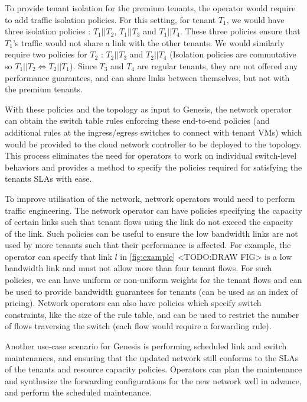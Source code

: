 \documentclass[]{sig}
\begin{document}
To provide tenant isolation for the premium tenants, the operator would require to add traffic isolation policies. For this setting, for tenant $T_1$, we would have three isolation policies : $T_1 || T_2$, $T_1 || T_3$ and $T_1 || T_4$. These three policies ensure that $T_1$'s traffic would not share a link with the other tenants. We would similarly require two policies for $T_2$ : $T_2 || T_3$ and $T_2 || T_4$ (Isolation policies are commutative so $T_1 || T_2 \iff T_2 || T_1$). Since $T_3$ and $T_4$ are regular tenants, they are not offered any performance guarantees, and can share links between themselves, but not with the premium tenants.  

With these policies and the topology as input to Genesis, the network operator can obtain the switch table rules enforcing these end-to-end policies (and additional rules at the ingress/egress switches to connect with tenant VMs) which would be provided to the cloud network controller to be deployed to the topology. This process eliminates the need for operators to work on individual switch-level behaviors and provides a method to specify the policies required for satisfying the tenants SLAs with ease.   

To improve utilisation of the network, network operators would need to perform traffic engineering. The network operator can have policies specifying the capacity of certain links such that tenant flows using the link do not exceed the capacity of the link. Such policies can be useful to ensure the low bandwidth links are not used by more tenants such that their performance is affected. For example, the operator can specify that link $l$ in \cref{fig:example} <TODO:DRAW FIG> is a low bandwidth link and must not allow more than four tenant flows. For such policies, we can have uniform or non-uniform weights for the tenant flows and can be used to provide bandwidth guarantees for tenants (can be used as an index of pricing). Network operators can also have policies which specify switch constraints, like the size of the rule table, and can be used to restrict the number of flows traversing the switch (each flow would require a forwarding rule). 

Another use-case scenario for Genesis is performing scheduled link and switch maintenances, and ensuring that the updated network still conforms to the SLAs of the tenants and resource capacity policies. Operators can plan the maintenance and synthesize the forwarding configurations for the new network well in advance, and perform the scheduled maintenance.
\end{document}
